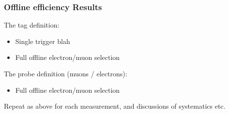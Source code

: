 


\subsubsection{Offline efficiency Results}

The tag definition:
\begin{itemize}
	\item  Single trigger blah
	\item Full offline electron/muon selection
\end{itemize}
	
The probe definition (muons / electrons):
\begin{itemize}
	\item  Full offline electron/muon selection
\end{itemize}

Repeat as above for each measurement, and discussions of systematics etc.


